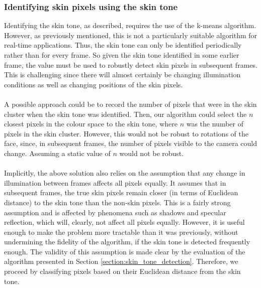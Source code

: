 \subsubsection{Identifying skin pixels using the skin tone}
Identifying the skin tone, as described, requires the use of the k-means algorithm. However, as previously mentioned, this is not a particularly suitable algorithm for real-time applications. Thus, the skin tone can only be identified periodically rather than for every frame. So given the skin tone identified in some earlier frame, the value must be used to robustly detect skin pixels in subsequent frames. This is challenging since there will almost certainly be changing illumination conditions as well as changing positions of the skin pixels.
\\ \\
A possible approach could be to record the number of pixels that were in the skin cluster when the skin tone was identified. Then, our algorithm could select the $n$ closest pixels in the colour space to the skin tone, where $n$ was the number of pixels in the skin cluster. However, this would not be robust to rotations of the face, since, in subsequent frames, the number of pixels visible to the camera could change. Assuming a static value of $n$ would not be robust.
\\ \\
Implicitly, the above solution also relies on the assumption that any change in illumination between frames affects all pixels equally. 
It assumes that in subsequent frames, the true skin pixels remain closer (in terms of Euclidean distance) to the skin tone than the non-skin pixels.
This is a fairly strong assumption and is affected by phenomena such as shadows and specular reflection, which will, clearly, not affect all pixels equally.
However, it is useful enough to make the problem more tractable than it was previously, without undermining the fidelity of the algorithm, if the skin tone is detected frequently enough. 
The validity of this assumption is made clear by the evaluation of the algorithm presented in Section \ref{section:skin_tone_detection}.
Therefore, we proceed by classifying pixels based on their Euclidean distance from the skin tone.
\\ \\
